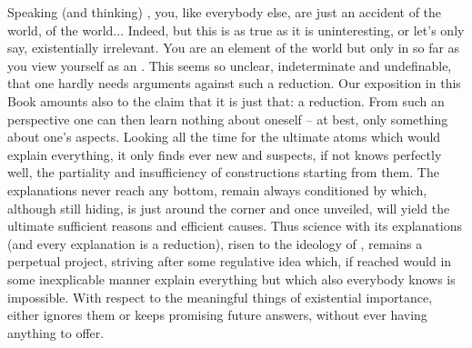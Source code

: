 Speaking (and thinking) , you, like everybody else, are just an
accident of the world, of the  world... Indeed, but this is as
true as it is uninteresting, or let's only say, existentially irrelevant.  You
are an element of the  world but only in so far as you view
yourself as an . This  seems so unclear, indeterminate
and undefinable, that one hardly needs arguments against such a reduction. Our
exposition in this Book amounts also to the claim that it is just that: a
reduction. From such an  perspective one can then learn
nothing about oneself -- at best, only something about one's 
aspects.  Looking all the time for the ultimate atoms which would explain
everything, it only finds ever new  and suspects, if not knows
perfectly well, the partiality and insufficiency of constructions starting from
them. The explanations never reach any bottom, remain always conditioned by
 which, although still hiding, is just around the corner
and once unveiled, 
will yield the ultimate sufficient reasons and efficient causes. Thus science
with its explanations (and every explanation is a reduction), risen to the
ideology of , remains a perpetual project, striving after some
regulative idea which, if reached would in some inexplicable manner explain
everything but which also everybody knows is impossible. With respect to the
meaningful things of existential importance,  either ignores
them or keeps promising future answers, 
without ever having anything to offer.


